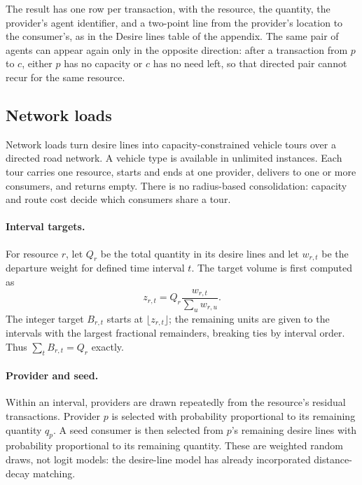 The result has one row per transaction, with the resource, the quantity, the provider's
agent identifier, and a two-point line from the provider's location to the consumer's, as
in the Desire lines table of the appendix. The same pair of agents can appear again only in the opposite direction: after a
transaction from $p$ to $c$, either $p$ has no capacity or $c$ has no need left, so that
directed pair cannot recur for the same resource.

\subsection{Network loads}

Network loads turn desire lines into capacity-constrained vehicle tours over a directed
road network. A vehicle type is available in unlimited instances. Each tour carries one
resource, starts and ends at one provider, delivers to one or more consumers, and returns
empty. There is no radius-based consolidation: capacity and route cost decide which
consumers share a tour.

\paragraph{Interval targets.}
For resource $r$, let $Q_r$ be the total quantity in its desire lines and let $w_{r,t}$
be the departure weight for defined time interval $t$. The target volume is first computed
as
\begin{equation}
  z_{r,t} = Q_r \frac{w_{r,t}}{\sum_{u} w_{r,u}}.
\end{equation}
The integer target $B_{r,t}$ starts at $\lfloor z_{r,t} \rfloor$; the remaining units are
given to the intervals with the largest fractional remainders, breaking ties by interval
order. Thus $\sum_t B_{r,t} = Q_r$ exactly.

\paragraph{Provider and seed.}
Within an interval, providers are drawn repeatedly from the resource's residual
transactions. Provider $p$ is selected with probability proportional to its remaining
quantity $q_p$. A seed consumer is then selected from $p$'s remaining desire lines with
probability proportional to its remaining quantity. These are weighted random draws, not
logit models: the desire-line model has already incorporated distance-decay matching.

